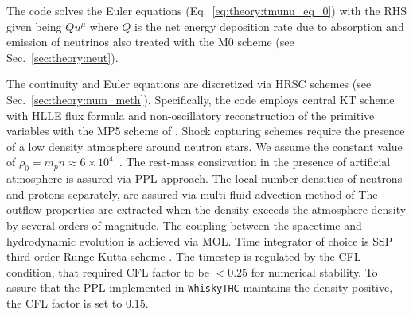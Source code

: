 
The code solves the Euler equations (Eq.~\eqref{eq:theory:tmunu_eq_0}) 
with the \ac{RHS} given being $ Q u^{\mu}$
%
%
%
where $Q$ is the net energy deposition rate due to absorption
and emission of neutrinos also treated with the M0 scheme  
(see Sec.~\ref{sec:theory:neut}).




The continuity and Euler equations are discretized via \ac{HRSC} schemes
(see Sec.~\ref{sec:theory:num_meth}).
%
Specifically, the code employs central \ac{KT} scheme \citep{Kurganov:2000} with 
\ac{HLLE} flux formula \citep{Einfeldt:1988} and non-oscillatory reconstruction 
of the primitive variables with the \ac{MP5} scheme of \citep{Suresh:1997}.
%
Shock capturing schemes require the presence of a low density atmosphere around neutron stars.
We assume the constant value of $\rho_0 = m_p n \approx 6\times 10^4$~\gcm.
%
The rest-mass consirvation in the presence of artificial atmosphere is assured via 
\ac{PPL} approach.
%
The local number densities of neutrons and protons separately, are assured via 
multi-fluid advection method of \citet{Plewa:1998nma}
%
The outflow properties are extracted when the density exceeds the atmosphere density
by several orders of magnitude.
%
The coupling between the spacetime and hydrodynamic evolution is achieved via 
\ac{MOL}.
%
Time integrator of choice is \ac{SSP} third-order Runge-Kutta scheme \citep{Gottlieb:2009}.
The timestep is regulated by the \ac{CFL} condition, that required \ac{CFL} factor 
to be $<0.25$ for numerical stability. 
To assure that the \ac{PPL} implemented in \texttt{WhiskyTHC} maintains 
the density positive, the \ac{CFL} factor is set to $0.15$.


